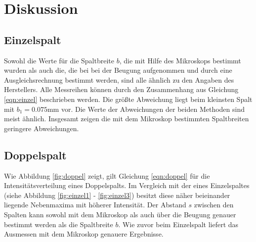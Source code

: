 \section{Diskussion}
\label{sec:Diskussion}

\subsection{Einzelspalt}
Sowohl die Werte für die Spaltbreite $b$, die mit Hilfe des Mikroskops bestimmt wurden als auch die, die bei bei der Beugung aufgenommen und durch eine Ausgleichsrechnung bestimmt werden, sind alle ähnlich zu den Angaben des Herstellers. Alle Messreihen können durch den Zusammenhang aus Gleichung \ref{eqn:einzel} beschrieben werden. Die größte Abweichung liegt  beim kleinsten Spalt mit $b_1=0.075 \si{\milli\meter}$ vor. Die Werte der Abweichungen der beiden Methoden sind meist ähnlich. Insgesamt zeigen die mit dem Mikroskop bestimmten Spaltbreiten geringere Abweichungen.

\subsection{Doppelspalt}
Wie Abbildung \ref{fig:doppel} zeigt, gilt Gleichung \ref{eqn:doppel} für die Intensitätsverteilung eines Doppelspalts. Im Vergleich mit der eines Einzelspaltes (siehe Abbildung \ref{fig:einzel1} -  \ref{fig:einzel3}) besitzt diese näher beieinander liegende Nebenmaxima mit höherer Intensität. Der Abstand $s$ zwischen den Spalten kann sowohl mit dem Mikroskop als auch über die Beugung genauer bestimmt werden als die Spaltbreite $b$. Wie zuvor beim Einzelspalt liefert das Ausmessen mit dem Mikroskop genauere Ergebnisse.
